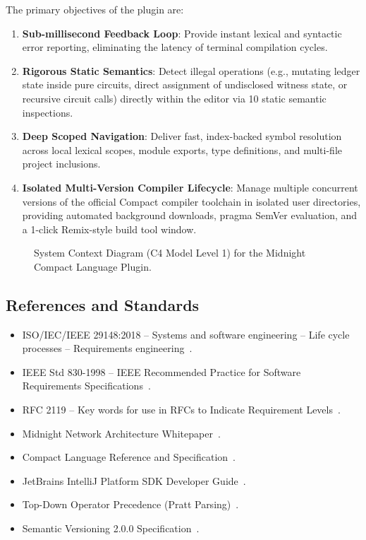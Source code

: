 The primary objectives of the plugin are:
\begin{enumerate}
    \item \textbf{Sub-millisecond Feedback Loop}: Provide instant lexical and syntactic error reporting, eliminating the latency of terminal compilation cycles.
    \item \textbf{Rigorous Static Semantics}: Detect illegal operations (e.g., mutating ledger state inside pure circuits, direct assignment of undisclosed witness state, or recursive circuit calls) directly within the editor via 10 static semantic inspections.
    \item \textbf{Deep Scoped Navigation}: Deliver fast, index-backed symbol resolution across local lexical scopes, module exports, type definitions, and multi-file project inclusions.
    \item \textbf{Isolated Multi-Version Compiler Lifecycle}: Manage multiple concurrent versions of the official Compact compiler toolchain in isolated user directories, providing automated background downloads, pragma SemVer evaluation, and a 1-click Remix-style build tool window.
\end{enumerate}

\begin{figure}[htbp]
    \centering
    
    \caption{System Context Diagram (C4 Model Level 1) for the Midnight Compact Language Plugin.}
    \label{fig:context_diagram}
\end{figure}

\subsection{References and Standards}
\begin{itemize}
    \item ISO/IEC/IEEE 29148:2018 -- Systems and software engineering -- Life cycle processes -- Requirements engineering~\cite{iso29148}.
    \item IEEE Std 830-1998 -- IEEE Recommended Practice for Software Requirements Specifications~\cite{ieee830}.
    \item RFC 2119 -- Key words for use in RFCs to Indicate Requirement Levels~\cite{rfc2119}.
    \item Midnight Network Architecture Whitepaper~\cite{midnightWhitepaper}.
    \item Compact Language Reference and Specification~\cite{compactSpec}.
    \item JetBrains IntelliJ Platform SDK Developer Guide~\cite{intellijSDK}.
    \item Top-Down Operator Precedence (Pratt Parsing)~\cite{pratt1973}.
    \item Semantic Versioning 2.0.0 Specification~\cite{semver2}.
\end{itemize}
